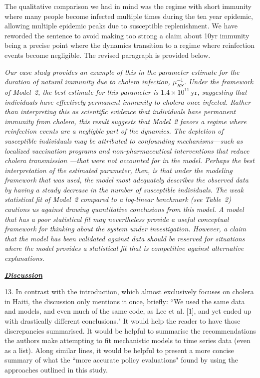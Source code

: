 \documentclass[11pt]{article}
\newcommand\muRS{\mu_{RS}}
\newcommand\report[1]{{\color{mygreen} \vspace{1mm}\hspace{0.25in}\parbox{6in}{\em #1}}}
\newcommand\article[1]{{\color{blue} \vspace{1mm}\hspace{0.25in}\parbox{6in}{\em #1}}}
\begin{document}
The qualitative comparison we had in mind was the regime with short immunity where many people become infected multiple times during the ten year epidemic, allowing multiple epidemic peaks due to susceptible replenishment.
We have reworded the sentence to avoid making too strong a claim about 10yr immunity being a precise point where the dynamics transition to a regime where reinfection events become negligible. 
The revised paragraph is provided below. 

\article{Our case study provides an example of this in the parameter estimate for the duration of natural immunity due to cholera infection, $\muRS^{-1}$.
Under the framework of Model~2, the best estimate for this parameter is $1.4 \times 10^{11} \, \mathrm{yr}$, suggesting that individuals have effectively permanent immunity to cholera once infected.
Rather than interpreting this as scientific evidence that individuals have permanent immunity from cholera, this result suggests that Model~2 favors a regime where reinfection events are a negligble part of the dynamics.
The depletion of susceptible individuals may be attributed to confounding mechanisms---such as localized vaccination programs and non-pharmaceutical interventions that reduce cholera transmission \cite{trevisin22, rebaudet21}---that were not accounted for in the model.
Perhaps the best interpretation of the estimated parameter, then, is that under the modeling framework that was used, the model most adequately describes the observed data by having a steady decrease in the number of susceptible individuals.
The weak statistical fit of Model~2 compared to a log-linear benchmark (see Table~2) cautions us against drawing quantitative conclusions from this model.
A model that has a poor statistical fit may nevertheless provide a useful conceptual framework for thinking about the system under investigation.
However, a claim that the model has been validated against data should be reserved for situations where the model provides a statistical fit that is competitive against alternative explanations.}


\report{
  \textbf{\underline{Discussion}}

13. In contrast with the introduction, which almost exclusively focuses on cholera in Haiti, the discussion only mentions it once, briefly: ``We used the same data and models, and even much of the same code, as Lee et al. [1], and yet ended up with drastically different conclusions." It would help the reader to have those discrepancies summarised. It would be helpful to summarise the recommendations the authors make attempting to fit mechanistic models to time series data (even as a list). Along similar lines, it would be helpful to present a more concise summary of what the ``more accurate policy evaluations" found by using the approaches outlined in this study.
}
\end{document}
